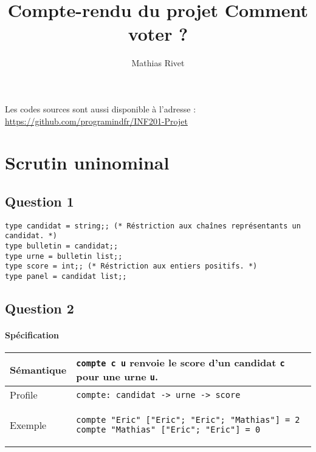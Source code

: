 \documentclass[french, 10pt, a4paper]{article}
\title{Compte-rendu du projet Comment voter ?}
\author{
	Mathias Rivet
}
\begin{document}
	\maketitle

	Les codes sources sont aussi disponible à l'adresse : \href{https://github.com/programindfr/INF201-Projet}{https://github.com/programindfr/INF201-Projet}

	\tableofcontents



\section{Scrutin uninominal}

\subsection{Question 1}

\begin{verbatim}
type candidat = string;; (* Réstriction aux chaînes représentants un candidat. *)
type bulletin = candidat;;
type urne = bulletin list;;
type score = int;; (* Réstriction aux entiers positifs. *)
type panel = candidat list;;
\end{verbatim}



\subsection{Question 2}

\paragraph{Spécification}

\begin{center}
	\begin{tabular}{|p{2cm}|p{\dimexpr\linewidth-2cm-4\tabcolsep-3\arrayrulewidth}|}
		\hline
		Sémantique
		&
		\texttt{compte c u} renvoie le score d'un candidat \texttt{c} pour une urne \texttt{u}. %
%
		\\
		\hline
		Profile
		&
		\texttt{compte: candidat -> urne -> score}
%
		\\
		\hline
		Exemple
		&
		\begin{verbatim}
compte "Eric" ["Eric"; "Eric"; "Mathias"] = 2
compte "Mathias" ["Eric"; "Eric"] = 0
		\end{verbatim}
%
		\\
		\hline
	\end{tabular}
\end{center}
\end{document}
